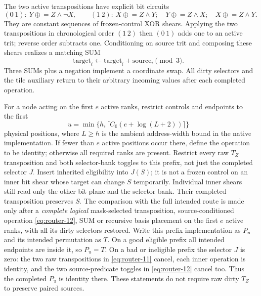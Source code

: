 The two active transpositions have explicit bit circuits
\begin{equation}
 (0\ 1):\ Y\mathrel{\oplus}=Z\wedge\neg X,
 \qquad
 (1\ 2):\ X\mathrel{\oplus}=Z\wedge Y;\quad
 Y\mathrel{\oplus}=Z\wedge X;\quad
 X\mathrel{\oplus}=Z\wedge Y.                           \label{eq:router-13}
\end{equation}
They are constant sequences of frozen-control XOR shears. Applying the
two transpositions in chronological order $(1\ 2)$ then $(0\ 1)$ adds
one to an active trit; reverse order subtracts one. Conditioning on
source trit and composing these shears realizes a matching SUM
\begin{equation}
 \text{target}_i\gets\text{target}_i+\text{source}_i\pmod3.
                                                               \label{eq:router-14}
\end{equation}
Three SUMs plus a negation implement a coordinate swap. All dirty
selectors and the tile auxiliary return to their arbitrary incoming
values after each completed operation.

For a node acting on the first $e$ active ranks, restrict controls and
endpoints to the first
\[
 u=\min\{h,\lceil C_0(e+\log(L+2))\rceil\}
\]
physical positions, where $L\ge h$ is the ambient address-width bound
in the native implementation. If fewer than $e$ active positions occur there,
define the operation to be identity; otherwise all required ranks are
present. Restrict every raw $T_Z$ transposition and both selector-bank
toggles to this prefix, not just the completed selector $J$. Insert
inherited eligibility into $J(S)$; it is not a frozen control on an
inner bit shear whose target can change $S$ temporarily. Individual
inner shears still read only the other bit plane and the selector bank.
Their completed transposition preserves $S$. The comparison with the
full intended route is made only after a \emph{complete logical}
mask-selected transposition, source-conditioned operation \eqref{eq:router-12}, SUM
or recursive basis placement on the first $e$ active ranks, with all
its dirty selectors restored. Write this
prefix implementation as $P_u$ and its intended permutation as $T$.
On a good eligible prefix all intended endpoints are inside it, so
$P_u=T$. On a bad or ineligible prefix the selector $J$ is zero:
the two raw transpositions in \eqref{eq:router-11} cancel, each inner operation is
identity, and the two source-predicate toggles in \eqref{eq:router-12} cancel too.
Thus the completed $P_u$ is identity there. These statements do not
require raw dirty $T_Z$ to preserve paired sources.

